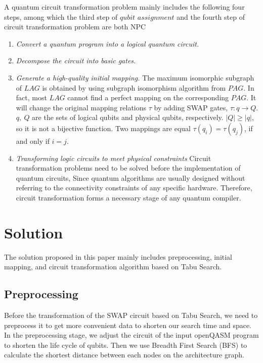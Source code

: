 \documentclass[runningheads]{llncs}
\begin{document}
A quantum circuit transformation problem mainly includes the following four steps, 
among which the third step of $qubit$ $assignment$ and the fourth step of circuit transformation 
problem are both NPC~\cite{2018QubitSiraichi}
\begin{enumerate}
	\item \emph{Convert a quantum program into a logical quantum circuit.}
	\item \emph{Decompose the circuit into basic gates.} 
	\item \emph{Generate a high-quality initial mapping.} 
	The maximum isomorphic subgraph of $LAG$ is 
	obtained by using subgraph isomorphism algorithm from $PAG$.
	In fact, most $LAG$ cannot find a perfect mapping 
	on the corresponding $PAG$.
	It will change the original mapping relations $\tau$ by adding SWAP gates, $\tau:q \rightarrow Q $. 
	$q,\ Q$ are the sets of logical qubits and physical qubits, respectively.
	$|Q| \geq |q|$, so it is not a bijective function.
	Two mappings are equal $\tau(q_{i})=\tau(q_{j})$, if and only if $i=j$.
	\item \emph{Transforming logic circuits to meet physical constraints}
	Circuit transformation problems 
	need to be solved before the implementation of quantum circuits, 
	Since quantum algorithms are usually designed without referring to 
	the connectivity constraints of any specific hardware. 
	Therefore, circuit transformation forms a necessary stage of any quantum compiler.
\end{enumerate}

\section{Solution}
\label{Solution}
The solution proposed in this paper mainly includes preprocessing, 
initial mapping, 
and  circuit transformation algorithm based on Tabu Search.
\subsection{Preprocessing}
Before the transformation of the SWAP circuit based on Tabu Search, 
we need to preprocess it to get more convenient data to shorten our search time and space.
In the preprocessing stage, we adjust the circuit of the input openQASM 
program to shorten the life cycle of qubits. Then we use Breadth First Search (BFS) to calculate 
the shortest distance between each nodes on the architecture graph.
\end{document}
